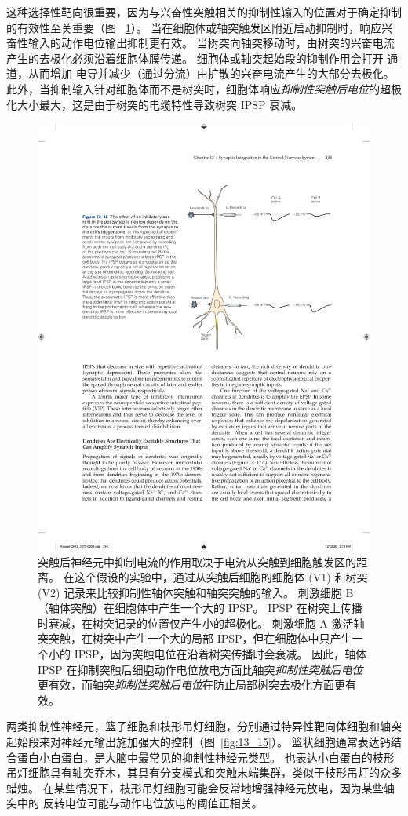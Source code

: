 这种选择性靶向很重要，因为与兴奋性突触相关的抑制性输入的位置对于确定抑制的有效性至关重要（图 ~\ref{fig:13_16}）。
当在细胞体或轴突触发区附近启动抑制时，响应兴奋性输入的动作电位输出抑制更有效。
当树突向轴突移动时，由树突的兴奋电流产生的去极化必须沿着细胞体膜传递。
细胞体或轴突起始段的抑制作用会打开  通道，从而增加  电导并减少（通过分流）由扩散的兴奋电流产生的大部分去极化。
此外，当抑制输入针对细胞体而不是树突时，细胞体响应\textit{抑制性突触后电位}的超极化大小最大，这是由于树突的电缆特性导致树突 IPSP 衰减。


\begin{figure}[htbp]
	\centering
	\includegraphics[width=0.6\linewidth]{chap13/fig_13_16}
	\caption{突触后神经元中抑制电流的作用取决于电流从突触到细胞触发区的距离。 在这个假设的实验中，通过从突触后细胞的细胞体 (V1) 和树突 (V2) 记录来比较抑制性轴体突触和轴突突触的输入。 刺激细胞 B（轴体突触）在细胞体中产生一个大的 IPSP。 IPSP 在树突上传播时衰减，在树突记录的位置仅产生小的超极化。 刺激细胞 A 激活轴突突触，在树突中产生一个大的局部 IPSP，但在细胞体中只产生一个小的 IPSP，因为突触电位在沿着树突传播时会衰减。 因此，轴体 IPSP 在抑制突触后细胞动作电位放电方面比轴突\textit{抑制性突触后电位}更有效，而轴突\textit{抑制性突触后电位}在防止局部树突去极化方面更有效。}
	\label{fig:13_16}
\end{figure}


两类抑制性神经元，篮子细胞和枝形吊灯细胞，分别通过特异性靶向体细胞和轴突起始段来对神经元输出施加强大的控制（图~\ref{fig:13_15}）。
篮状细胞通常表达钙结合蛋白小白蛋白，是大脑中最常见的抑制性神经元类型。
也表达小白蛋白的枝形吊灯细胞具有轴突乔木，其具有分支模式和突触末端集群，类似于枝形吊灯的众多蜡烛。
在某些情况下，枝形吊灯细胞可能会反常地增强神经元放电，因为某些轴突中的  反转电位可能与动作电位放电的阈值正相关。


